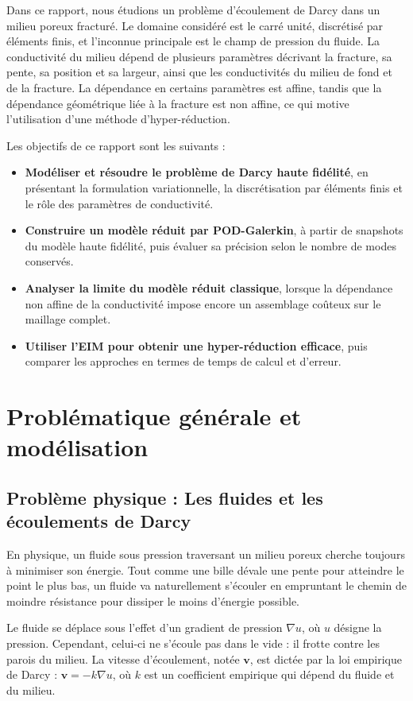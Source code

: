 \documentclass[12pt,a4paper]{article}
\begin{document}
Dans ce rapport, nous étudions un problème d’écoulement de Darcy dans un milieu poreux fracturé. Le domaine considéré est le carré unité, discrétisé par éléments finis, et l’inconnue principale est le champ de pression du fluide. La conductivité du milieu dépend de plusieurs paramètres décrivant la fracture, sa pente, sa position et sa largeur, ainsi que les conductivités du milieu de fond et de la fracture. La dépendance en certains paramètres est affine, tandis que la dépendance géométrique liée à la fracture est non affine, ce qui motive l’utilisation d’une méthode d’hyper-réduction.

Les objectifs de ce rapport sont les suivants :
\begin{itemize}
    \item \textbf{Modéliser et résoudre le problème de Darcy haute fidélité}, en présentant la formulation variationnelle, la discrétisation par éléments finis et le rôle des paramètres de conductivité.
    \item \textbf{Construire un modèle réduit par POD-Galerkin}, à partir de snapshots du modèle haute fidélité, puis évaluer sa précision selon le nombre de modes conservés.
    \item \textbf{Analyser la limite du modèle réduit classique}, lorsque la dépendance non affine de la conductivité impose encore un assemblage coûteux sur le maillage complet.
    \item \textbf{Utiliser l’EIM pour obtenir une hyper-réduction efficace}, puis comparer les approches en termes de temps de calcul et d’erreur.
\end{itemize}


\section{Problématique générale et modélisation}

\subsection{Problème physique : Les fluides et les écoulements de Darcy}

En physique, un fluide sous pression traversant un milieu poreux cherche toujours 
à minimiser son énergie. Tout comme une bille dévale une pente pour atteindre le 
point le plus bas, un fluide va naturellement s'écouler en empruntant le chemin de moindre 
résistance pour dissiper le moins d'énergie possible.

Le fluide se déplace sous l'effet d'un gradient de pression $\nabla u$, où $u$ désigne la pression. 
Cependant, celui-ci ne s'écoule pas dans le vide : il frotte contre les parois du milieu. La vitesse d'écoulement, notée $\mathbf{v}$, est dictée par la loi empirique de Darcy \cite{darcy_wiki} : 
$\mathbf{v} = -k \nabla u$, où $k$ est un coefficient empirique qui dépend du fluide et du milieu.
\end{document}

